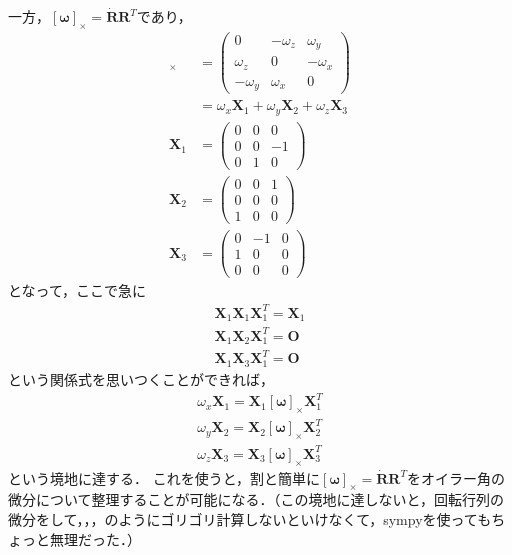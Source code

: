 一方，$[\boldsymbol{\omega}]_{\times} = \dot{\boldsymbol{R}} \boldsymbol{R}^{T}$であり，
\begin{align}
  [\boldsymbol{\omega}]_{\times} &=
  \begin{pmatrix}
    0  & -\omega_{z} & \omega_{y}\\
    \omega_{z} & 0 & -\omega_{x}\\
    - \omega_{y}  & \omega_{x} & 0
  \end{pmatrix}\\
  &= \omega_{x} \boldsymbol{X}_1 + \omega_{y} \boldsymbol{X}_2 + \omega_{z} \boldsymbol{X}_3\\
  \boldsymbol{X}_1 &=
  \begin{pmatrix}
    0 & 0 & 0\\
    0 & 0 & -1\\
    0 & 1 & 0
  \end{pmatrix}\\
  \boldsymbol{X}_2 &=
  \begin{pmatrix}
    0 & 0 & 1\\
    0 & 0 & 0\\
    1 & 0 & 0
  \end{pmatrix}\\
  \boldsymbol{X}_3 &=
  \begin{pmatrix}
    0 & -1 & 0\\
    1 & 0 & 0\\
    0 & 0 & 0
  \end{pmatrix}
\end{align}
となって，ここで急に
\begin{gather}
  \boldsymbol{X}_1 \boldsymbol{X}_1 \boldsymbol{X}_1^{T} = \boldsymbol{X}_1\\
  \boldsymbol{X}_1 \boldsymbol{X}_2 \boldsymbol{X}_1^{T} = \boldsymbol{O}\\
  \boldsymbol{X}_1 \boldsymbol{X}_3 \boldsymbol{X}_1^{T} = \boldsymbol{O}
\end{gather}
という関係式を思いつくことができれば，
\begin{gather}
  \omega_{x} \boldsymbol{X}_1 = \boldsymbol{X}_1 [\boldsymbol{\omega}]_{\times} \boldsymbol{X}_1^{T}\\
  \omega_{y} \boldsymbol{X}_2 = \boldsymbol{X}_2 [\boldsymbol{\omega}]_{\times} \boldsymbol{X}_2^{T}\\
  \omega_{z} \boldsymbol{X}_3 = \boldsymbol{X}_3 [\boldsymbol{\omega}]_{\times} \boldsymbol{X}_3^{T}
\end{gather}
という境地に達する．
これを使うと，割と簡単に$[\boldsymbol{\omega}]_{\times} = \dot{\boldsymbol{R}} \boldsymbol{R}^{T}$をオイラー角の微分について整理することが可能になる．（この境地に達しないと，回転行列の微分をして，，，のようにゴリゴリ計算しないといけなくて，sympyを使ってもちょっと無理だった．）

